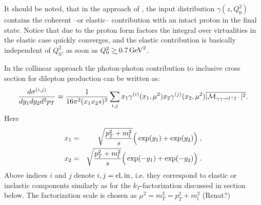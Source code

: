 It should be noted, that in the approach of
\cite{Martin:2004dh,Martin:2014nqa}, the input distribution $\gamma(z,Q_0^2)$ contains the coherent --or elastic-- contribution with an intact proton in the final state.
Notice that due to the proton form factors the integral over
virtualities in the elastic case quickly converges, and the elastic
contribution is basically independent of $Q_0^2$, as soon as $Q_0^2 \gsim 0.7 \, \rm{GeV}^2$.


In the collinear approach the photon-photon contribution
to inclusive cross section for dilepton production can be written as:
%
\begin{equation}
{d \sigma^{(i,j)} \over d y_1 d y_2 d^2 p_T} 
= {1 \over 16 \pi^2 (x_1 x_2 s)^2}\sum_{i,j} 
x_1 \gamma^{(i)}(x_1,\mu^2) 
x_2 \gamma^{(j)}(x_2,\mu^2)
\overline{ |{\cal M}_{\gamma \gamma \rightarrow l^+ l^-}|^2 }.
\label{collinear_factorization_formula}
\end{equation}
%
Here 
%
\begin{eqnarray}
 x_1 &=&  \sqrt{p_T^2 + m_l^2 \over s} 
\Big( \exp(y_1) + \exp(y_2) \Big) \; , \nonumber \\
 x_2 &=&  \sqrt{p_T^2 + m_l^2 \over s} 
\Big( \exp(-y_1) + \exp(-y_2) \Big) \; . 
\end{eqnarray}
Above indices $i$ and $j$ denote $i,j = \rm{el, in}$, i.e. they
correspond to elastic or inelastic components similarly as for 
the $k_T$-factorization discussed in section below.
The factorization scale is chosen as $\mu^2 = m_T^2 = p_T^2 + m_l^2$ (Renat?)
